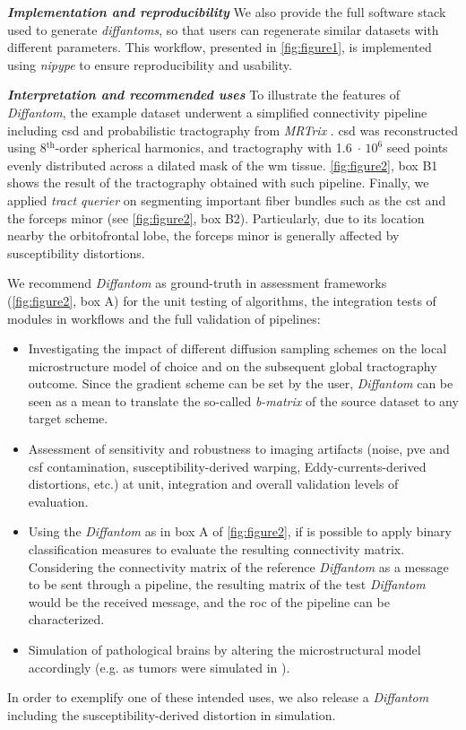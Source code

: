\documentclass[english]{frontiers/frontiersSCNS} %
\newcommand{\e}[1]{\ensuremath{\;\cdot\,\text{10}^\text{#1}}}
\begin{document}
\noindent\textbf{\textit{Implementation and reproducibility\textcolon}\label{sec:data_workflow}} %
We also provide the full software stack used to generate \emph{diffantoms}, so that users can
  regenerate similar datasets with different parameters.
This workflow, presented in \autoref{fig:figure1}, is implemented using
  \emph{nipype} \citep{gorgolewski_nipype_2011} to ensure reproducibility and usability.

\noindent\textbf{\textit{Interpretation and recommended uses\textcolon}\label{sec:data_use}} %
To illustrate the features of \emph{Diffantom}, the example dataset underwent a simplified
  connectivity pipeline including \gls*{csd} and probabilistic tractography from
  \emph{MRTrix} \citep{tournier_mrtrix_2012}.
\Gls*{csd} was reconstructed using 8$^\text{th}$-order spherical harmonics, and tractography with 1.6\e{6}
  seed points evenly distributed across a dilated mask of the \gls*{wm} tissue.
\autoref{fig:figure2}, box B1 shows the result of the tractography obtained with such pipeline.
Finally, we applied \emph{tract querier} \citep{wassermann_on_2013} on segmenting important fiber bundles such
  as the \gls*{cst} and the forceps minor (see \autoref{fig:figure2}, box B2).
Particularly, due to its location nearby the orbitofrontal lobe, the forceps minor is generally affected by
  susceptibility distortions.

We recommend \emph{Diffantom} as ground-truth in assessment frameworks (\autoref{fig:figure2}, box A)
  for the unit testing of algorithms, the integration tests of modules in workflows and the full
  validation of pipelines:
\begin{itemize}
  \item Investigating the impact of different diffusion sampling schemes on the local microstructure
    model of choice and on the subsequent global tractography outcome.
  Since the gradient scheme can be set by the user, \emph{Diffantom} can be seen as a mean to translate the so-called
  \emph{b-matrix} of the source dataset to any target scheme.
  \item Assessment of sensitivity and robustness to imaging artifacts (noise, \acrlong{pve} and \gls*{csf} contamination,
    susceptibility-derived warping, Eddy-currents-derived distortions, etc.) at unit, integration and overall validation levels
    of evaluation.
  \item Using the \emph{Diffantom} as in box A of \autoref{fig:figure2}, if is possible to apply binary classification measures
    to evaluate the resulting connectivity matrix.
  Considering the connectivity matrix of the reference \emph{Diffantom} as a message to be sent through a pipeline, the resulting
    matrix of the test \emph{Diffantom} would be the received message, and the \acrfull*{roc} of the pipeline can be
    characterized.
  \item Simulation of pathological brains by altering the microstructural
    model accordingly (e.g. as tumors were simulated in \cite{kaus_simulation_2000}).
\end{itemize}
In order to exemplify one of these intended uses, we also release a \emph{Diffantom} including the susceptibility-derived
  distortion in simulation.
\end{document}
